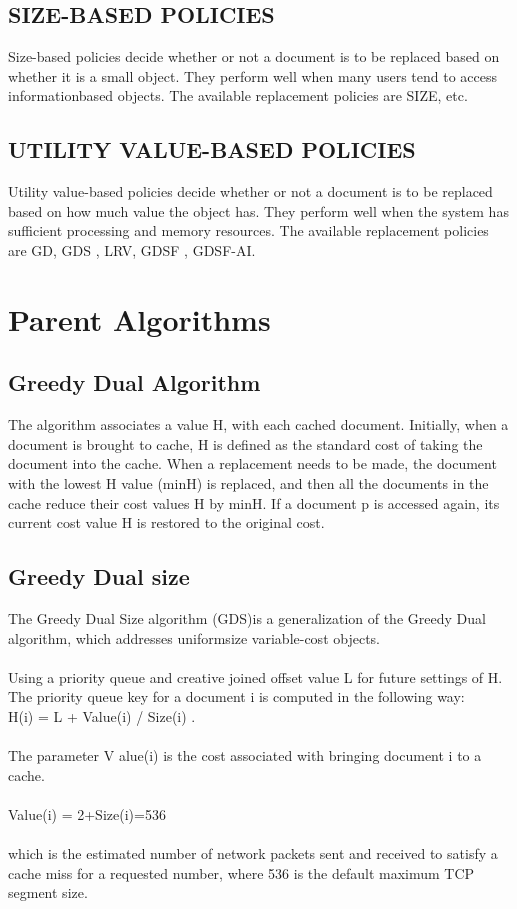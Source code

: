 \documentclass[conference]{IEEEtran}
\begin{document}
\subsection{SIZE-BASED POLICIES}
Size-based policies decide whether or not a document is to be replaced based on whether it is a small object. They perform well when many users tend to access informationbased objects. The available replacement policies are SIZE, etc.

\subsection{UTILITY VALUE-BASED POLICIES}
Utility value-based policies decide whether or not a document is to be replaced based on how much value the object has. They perform well when the system has sufficient processing and memory resources. The available replacement policies are GD, GDS , LRV, GDSF , GDSF-AI.

\section{Parent Algorithms}

\subsection{Greedy Dual Algorithm}
The algorithm associates a value  H, with each cached document. Initially, when a document is brought to cache, H is defined as the standard cost of taking the document into the cache. When a replacement needs to be made, the document with the lowest H value (minH)  is replaced, and then all the documents in the cache reduce their cost values H by minH. If a document p is accessed again, its current cost value H is restored to the original cost.

\subsection{Greedy Dual size}
The Greedy Dual Size algorithm (GDS)is a generalization of the Greedy Dual algorithm, which addresses uniformsize variable-cost objects. \\ \\
Using a priority queue and creative joined offset value L for future settings of H. The priority queue key for a document i is computed in the following way:\\
H(i) = L + Value(i) / Size(i) .
\\ \\
The parameter V alue(i) is the cost associated with bringing document i to a cache.
\\ \\  Value(i) = 2+Size(i)=536\\ \\ which is the estimated number of network packets sent and received to satisfy a cache miss for a requested number, where 536 is the default maximum TCP segment size.
\end{document}
